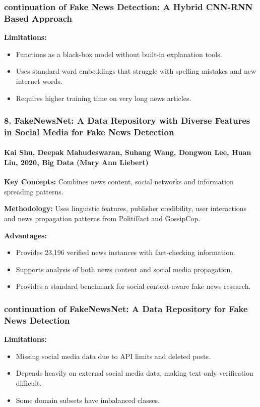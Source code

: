 \documentclass{beamer}
\begin{document}
\begin{frame}
\frametitle{continuation of Fake News Detection: A Hybrid CNN-RNN Based Approach}
\large{
\textbf{Limitations:}
\begin{itemize}
    \item Functions as a black-box model without built-in explanation tools.
    \item Uses standard word embeddings that struggle with spelling mistakes and new internet words.
    \item Requires higher training time on very long news articles.
\end{itemize}
}
\end{frame}

\begin{frame}
\frametitle{8. FakeNewsNet: A Data Repository with Diverse Features in Social Media for Fake News Detection}
\framesubtitle{Kai Shu, Deepak Mahudeswaran, Suhang Wang, Dongwon Lee, Huan Liu, 2020, Big Data (Mary Ann Liebert)}
\small{
\textbf{Key Concepts:} Combines news content, social networks and information spreading patterns. \par\vspace{0.15cm}
\textbf{Methodology:} Uses linguistic features, publisher credibility, user interactions and news propagation patterns from PolitiFact and GossipCop. \par\vspace{0.15cm}
\textbf{Advantages:}
\begin{itemize}
    \item Provides 23,196 verified news instances with fact-checking information.
    \item Supports analysis of both news content and social media propagation.
    \item Provides a standard benchmark for social context-aware fake news research.
\end{itemize}
}
\end{frame}

\begin{frame}
\frametitle{continuation of FakeNewsNet: A Data Repository for Fake News Detection}
\large{
\textbf{Limitations:}
\begin{itemize}
    \item Missing social media data due to API limits and deleted posts.
    \item Depends heavily on external social media data, making text-only verification difficult.
    \item Some domain subsets have imbalanced classes.
\end{itemize}
}
\end{frame}
\end{document}
